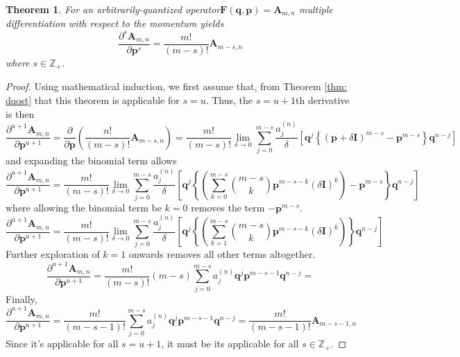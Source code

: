 \documentclass[a4paper]{article}
\newtheorem{theorem}{Theorem}[section]
\theoremstyle{definition}
\begin{document}
\begin{theorem}
	For an arbitrarily-quantized operator$\textbf{F}(\textbf{q},\textbf{p})=\textbf{A}_{m,n}$ multiple differentiation with respect to the momentum yields
	\begin{equation}
		\frac{\partial^s\textbf{A}_{m,n}}{\partial\textbf{p}^s}=\frac{m!}{(m-s)!}\textbf{A}_{m-s,n}
	\end{equation}
	where $s\in\mathbb{Z}_+$. 
\end{theorem}
\begin{proof}
	Using mathematical induction, we first assume that, from Theorem \ref{thm: dqost} that this theorem is applicable for $s=u$. Thus, the $s=u+1$th derivative is then
	\begin{equation}
		\frac{\partial^{u+1}{\textbf{A}_{m,n}}}{\partial\textbf{p}^{u+1}}=\frac{\partial}{\partial\textbf{p}}\left(\frac{n!}{(m-s)!}\textbf{A}_{m-s,n}\right)=\frac{m!}{(m-s)!}\lim_{\delta\to0}\sum_{j=0}^{m-s}\frac{a_j^{(n)}}{\delta}\left[\textbf{q}^j\left\{(\textbf{p}+\delta\textbf{I})^{m-s}-\textbf{p}^{m-s}\right\}\textbf{q}^{n-j}\right]
	\end{equation}
	and expanding the binomial term allows
	\begin{equation}
		\frac{\partial^{u+1}{\textbf{A}_{m,n}}}{\partial\textbf{p}^{u+1}}=\frac{m!}{(m-s)!}\lim_{\delta\to0}\sum_{j=0}^{m-s}\frac{a_j^{(n)}}{\delta}\left[\textbf{q}^j\left\{\left(\sum_{k=0}^{m-s}\binom{m-s}{k}\textbf{p}^{m-s-k}(\delta\textbf{I})^k\right)-\textbf{p}^{m-s}\right\}\textbf{q}^{n-j}\right]
	\end{equation}
	where allowing the binomial term be $k=0$ removes the term $-\textbf{p}^{m-s}$. 
	\begin{equation}
		\frac{\partial^{u+1}{\textbf{A}_{m,n}}}{\partial\textbf{p}^{u+1}}=\frac{m!}{(m-s)!}\lim_{\delta\to0}\sum_{j=0}^{m-s}\frac{a_j^{(n)}}{\delta}\left[\textbf{q}^j\left\{\left(\sum_{k=1}^{m-s}\binom{m-s}{k}\textbf{p}^{m-s-k}(\delta\textbf{I})^k\right)\right\}\textbf{q}^{n-j}\right]
	\end{equation}
	Further exploration of $k=1$ onwards removes all other terms altogether. 
	\begin{equation}
		\frac{\partial^{u+1}{\textbf{A}_{m,n}}}{\partial\textbf{p}^{u+1}}=\frac{m!}{(m-s)!}(m-s)\sum_{j=0}^{m-s}a_j^{(n)}\textbf{q}^j\textbf{p}^{m-s-1}\textbf{q}^{n-j}=
	\end{equation}
	Finally,
	\begin{equation}
		\frac{\partial^{u+1}{\textbf{A}_{m,n}}}{\partial\textbf{p}^{u+1}}=\frac{m!}{(m-s-1)!}\sum_{j=0}^{m-s}a_j^{(n)}\textbf{q}^j\textbf{p}^{m-s-1}\textbf{q}^{n-j}=\frac{m!}{(m-s-1)!}\textbf{A}_{m-s-1,n}
	\end{equation}
	Since it's applicable for all $s=u+1$, it must be its applicable for all $s\in\mathbb{Z}_+$.
\end{proof}
\end{document}

